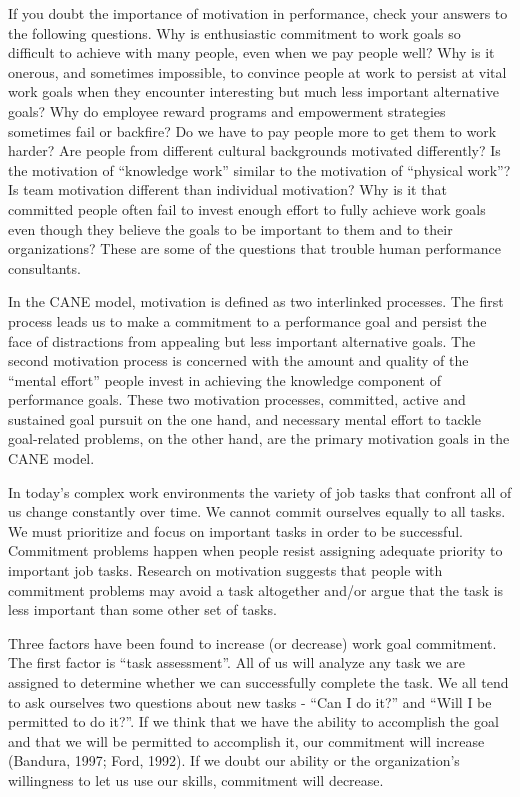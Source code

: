 If you doubt the importance of motivation in performance, check your answers to the following questions. Why is enthusiastic commitment to work goals so difficult to achieve with many people, even when we pay people well? Why is it onerous, and sometimes impossible, to convince people at work to persist at vital work goals when they encounter interesting but much less important alternative goals? Why do employee reward programs and empowerment strategies sometimes fail or backfire? Do we have to pay people more to get them to work harder? Are people from different cultural backgrounds motivated differently? Is the motivation of “knowledge work” similar to the motivation of “physical work”? Is team motivation different than individual motivation? Why is it that committed people often fail to invest enough effort to fully achieve work goals even though they believe the goals to be important to them and to their organizations? These are some of the questions that trouble human performance consultants.

In the CANE model, motivation is defined as two interlinked processes. The first process leads us to make a commitment to a performance goal and persist the face of distractions from appealing but less important alternative goals. The second motivation process is concerned with the amount and quality of the “mental effort” people invest in achieving the knowledge component of performance goals. These two motivation processes, committed, active and sustained goal pursuit on the one hand, and necessary mental effort to tackle goal-related problems, on the other hand, are the primary motivation goals in the CANE model.

In today’s complex work environments the variety of job tasks that confront all of us change constantly over time. We cannot commit ourselves equally to all tasks. We must prioritize and focus on important tasks in order to be successful. Commitment problems happen when people resist assigning adequate priority to important job tasks. Research on motivation suggests that people with commitment problems may avoid a task altogether and/or argue that the task is less important than some other set of tasks.

Three factors have been found to increase (or decrease) work goal commitment. The first factor is “task assessment”. All of us will analyze any task we are assigned to determine whether we can successfully complete the task. We all tend to ask ourselves two questions about new tasks - “Can I do it?” and “Will I be permitted to do it?”. If we think that we have the ability to accomplish the goal and that we will be permitted to accomplish it, our commitment will increase (Bandura, 1997; Ford, 1992). If we doubt our ability or the organization’s willingness to let us use our skills, commitment will decrease.

